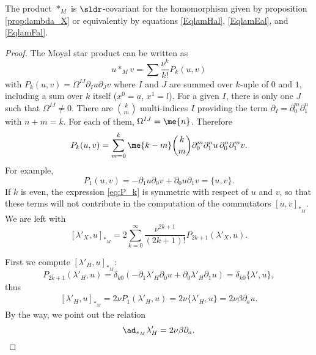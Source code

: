 \begin{proposition}
   The product $\ast_M$ is $\sldr$-covariant for the homomorphism given by proposition \ref{prop:lambda_X} or equivalently by equations \eqref{EqlamHal}, \eqref{EqlamEal}, and \eqref{EqlamFal}.
\end{proposition}

\begin{proof}
The Moyal star product can be written as
\[
   u\ast_M v=\sum \frac{\nu^k}{k!}P_k(u,v)
\]
with $P_k(u,v)=\Omega^{IJ}\partial_Iu\partial_Jv$ where $I$ and $J$ are summed over $k$-uple of $0$ and $1$, including a sum over $k$ itself ($x^0=a$, $x^1=l$). For a given $I$, there is only one $J$ such that $\Omega^{IJ}\neq 0$. There are $\binom{k}{m}$ multi-indices $I$ providing the term $\partial_I=\partial_0^m\partial_1^n$ with $n+m=k$. For each of them, $\Omega^{IJ}=\me{n}$. Therefore
\begin{equation}\label{eq:P_k}
  P_k(u,v)=\sum_{m=0}^k\me{k-m}\binom{k}{m}\partial_0^m\partial_1^nu\,\partial_0^n\partial_1^mv.
\end{equation}
For example,
\[
  P_1(u,v)=-\partial_1u\partial_0v+\partial_0u\partial_1v=\{u,v\}.
\]
If $k$ is even, the expression \eqref{eq:P_k} is symmetric with respect of $u$ and $v$, so that these terms will not contribute in the computation of the commutators $[u,v]_{\ast_M}$. We are left with
\begin{equation}\label{eq:comm_lambda_X}
   [\lambda'_X,u]_{\ast_M}
         =2\sum_{k=0}^{\infty}\frac{\nu^{2k+1}}{(2k+1)!}P_{2k+1}(\lambda'_X,u).
\end{equation}

First we compute $[\lambda'_H,u]_{\ast_M}$:
\begin{equation}
   P_{2k+1}(\lambda'_H,u)=\delta_{k0}(-\partial_1\lambda'_H\partial_0 u+\partial_0\lambda'_H\partial_1 u)=\delta_{k0}\{\lambda',u\},
\end{equation}
thus
\begin{equation}
\begin{split}
  [\lambda'_H,u]_{\ast_M}=2\nu P_1(\lambda'_H,u)
                        =2\nu\{\lambda'_H,u\}
            =2\nu\beta\partial_au.
\end{split}
\end{equation}
By the way, we point out the relation
\[
\ad_{\ast_M}\lambda'_H=2\nu\beta\partial_a.
\]


\end{proof}
